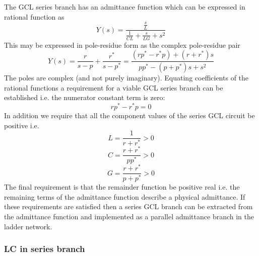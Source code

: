 The GCL series branch has an admittance function which can be expressed in rational function as
\begin{equation} 
Y\left(s\right)=\frac{\frac{s}{L}}{\frac{1}{C L} + \frac{s}{L G} + s^2}
\end{equation}
This may be expressed in pole-residue form as the complex pole-residue pair
\begin{equation} 
Y\left(s\right)= \frac{r}{s-p}+\frac{r^*}{s-p^*}=\frac{\left(rp^*-r^*p\right)+\left( r+r^*\right)s}{pp^*-\left( p+p^*\right)s+s^2}
\end{equation}
The poles are complex (and not purely imaginary). Equating coefficients of the rational functions a requirement for a viable GCL series branch can be established i.e. the numerator constant term is zero:
\begin{equation} 
rp^*-r^*p=0
\end{equation}
In addition we require that all the component values of the series GCL circuit be positive i.e.
\begin{equation} 
L=\frac{1}{r+r^*}>0
\end{equation}
\begin{equation} 
C=\frac{r+r^*}{pp^*}>0
\end{equation}
\begin{equation} 
G=\frac{r+r^*}{p+p^*}>0
\end{equation}
The final requirement is that the remainder function be positive real i.e. the remaining terms of the admittance function describe a physical admittance. If these requirements are satisfied then a series GCL branch can be extracted from the admittance function and implemented as a parallel admittance branch in the ladder network. 

\subsubsection{LC in series branch}

